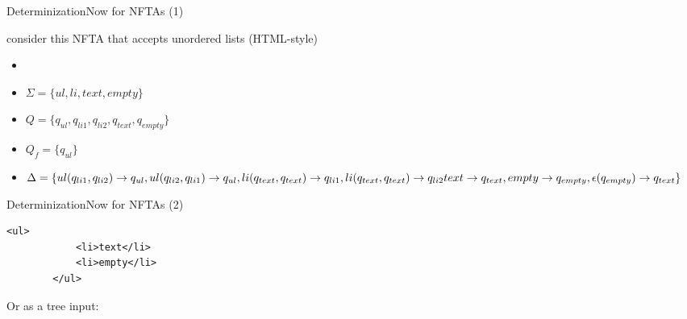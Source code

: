 \documentclass{beamer}
\begin{document}
\begin{frame}{Determinization}{Now for NFTAs (1)}
	\begin{example}
		consider this NFTA that accepts unordered lists (HTML-style)
		\begin{itemize}
			\item { 
				\automatonDefinition
			}
			\item {
				\(\Sigma = \{ul, li, text, empty\}\)
			}
			\item {
				\(Q = \{q_{ul}, q_{li1}, q_{li2}, q_{text}, q_{empty}\}\)
			}
			\item {
				\(Q_f = \{q_{ul}\}\)
			}
			\item {
				\(\Delta = \{
					ul(q_{li1},q_{li2}) \rightarrow q_{ul}, ul(q_{li2},q_{li1}) \rightarrow q_{ul}, \newline
					li(q_{text},q_{text}) \rightarrow q_{li1}, li(q_{text}, q_{text}) \rightarrow q_{li2}\newline
					text \rightarrow q_{text}, empty \rightarrow q_{empty}, \newline
					\epsilon(q_{empty}) \rightarrow q_{text}
				\}\)
			}
		\end{itemize}
	\end{example}
\end{frame}

\begin{frame}[fragile]{Determinization}{Now for NFTAs (2)}
	\begin{lstlisting}[frame=single]
		<ul>
		    <li>text</li>
		    <li>empty</li>
		</ul>
	\end{lstlisting}
	\pause
		Or as a tree input:
		\begin{center}
		\end{center}
\end{frame}
\end{document}

